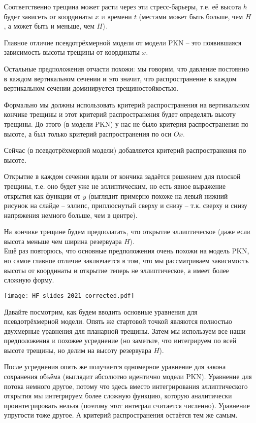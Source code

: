 \documentclass[main.tex]{subfiles}
\begin{document}
Соответственно трещина может расти через эти стресс-барьеры, т.е. её высота $h$ будет зависеть от координаты $x$ и времени $t$ (местами может быть больше, чем $H$, а может быть и меньше, чем $H$).

Главное отличие псевдотрёхмерной модели от модели PKN -- это появившаяся зависимость высоты трещины от координаты $x$.

Остальные предположения отчасти похожи: мы говорим, что давление постоянно в каждом вертикальном сечении и это значит, что распространение в каждом вертикальном сечении доминируется трещиностойкостью.

Формально мы должны использовать критерий распространения на вертикальном кончике трещины и этот критерий распространения будет определять высоту трещины.
До этого (в модели PKN) у нас не было критерия распространения по высоте, а был только критерий распространения по оси $Ox$.

Сейчас (в псевдотрёхмерной модели) добавляется критерий распространения по высоте.

Открытие в каждом сечении вдали от кончика задаётся решением для плоской трещины, т.е. оно будет уже не эллиптическим, но есть явное выражение открытия как функции от $y$ (выглядит примерно похоже на левый нижний рисунок на слайде -- эллипс, приплюснутый сверху и снизу -- т.к. сверху и снизу напряжения немного больше, чем в центре).

На кончике трещине будем предполагать, что открытие эллиптическое (даже если высота меньше чем ширина резервуара $H$).
\\

Ещё раз повторюсь, что основные предположения очень похожи на модель PKN, но самое главное отличие заключается в том, что мы рассматриваем зависимость высоты от координаты и открытие теперь не эллиптическое, а имеет более сложную форму.

\texttt{[image: HF\_slides\_2021\_corrected.pdf]}

Давайте посмотрим, как будем вводить основные уравнения для псевдотрёхмерной модели.
Опять же стартовой точкой являются полностью двухмерные уравнения для планарной трещины.
Затем мы используем все наши предположения и похожее усреднение (но заметьте, что интегрируем по всей высоте трещины, но делим на высоту резервуара $H$).

После усреднения опять же получается одномерное уравнение для закона сохранения объёма (выглядит абсолютно идентично модели PKN).
Уравнение для потока немного другое, потому что здесь вместо интегрирования эллиптического открытия мы интегрируем более сложную функцию, которую аналитически проинтегрировать нельзя (поэтому этот интеграл считается численно).
Уравнение упругости тоже другое.
А критерий распространения остаётся тем же самым.
\end{document}
